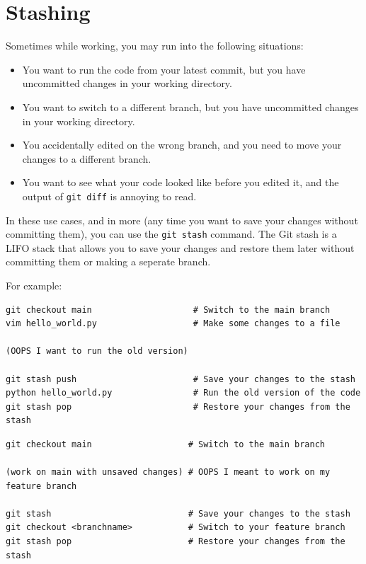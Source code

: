 \documentclass[fleqn]{article}
\begin{document}
\section*{Stashing}

Sometimes while working, you may run into the following situations:
\begin{itemize}
    \item You want to run the code from your latest commit, but you have
          uncommitted changes in your working directory.
    \item You want to switch to a different branch, but you have uncommitted
          changes in your working directory.
    \item You accidentally edited on the wrong branch, and you need to move your
          changes to a different branch.
    \item You want to see what your code looked like before you edited it, and
          the output of \texttt{git diff} is annoying to read.
\end{itemize}

In these use cases, and in more (any time you want to save your changes without
committing them), you can use the \texttt{git stash} command. The Git stash is 
a LIFO stack that allows you to save your changes and restore them later
without committing them or making a seperate branch.

For example:

\begin{lstlisting}
git checkout main                    # Switch to the main branch
vim hello_world.py                   # Make some changes to a file

(OOPS I want to run the old version)

git stash push                       # Save your changes to the stash
python hello_world.py                # Run the old version of the code
git stash pop                        # Restore your changes from the stash
\end{lstlisting}

\begin{lstlisting}
git checkout main                   # Switch to the main branch

(work on main with unsaved changes) # OOPS I meant to work on my feature branch

git stash                           # Save your changes to the stash
git checkout <branchname>           # Switch to your feature branch
git stash pop                       # Restore your changes from the stash
\end{lstlisting}
\end{document}
